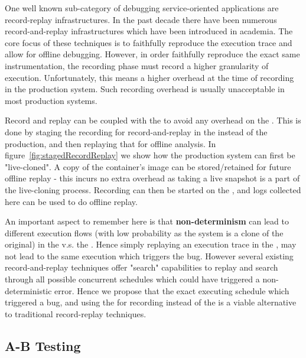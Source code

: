 One well known sub-category of debugging service-oriented applications are record-replay infrastructures.
In the past decade there have been numerous record-and-replay infrastructures which have been introduced in academia.
The core focus of these techniques is to faithfully reproduce the execution trace and allow for offline debugging.
However, in order faithfully reproduce the exact same instrumentation, the recording phase must record a higher granularity of execution.
Unfortunately, this means a higher overhead at the time of recording in the production system.
Such recording overhead is usually unacceptable in most production systems.

Record and replay can be coupled with the \debugcontainer to avoid any overhead on the \productioncontainer.
This is done by staging the recording for record-and-replay in the \debugcontainer instead of the production, and then replaying that for offline analysis.
In figure~\ref{fig:stagedRecordReplay} we show how the production system can first be "live-cloned". A copy of the container's image can be stored/retained for future offline replay - this incurs no extra overhead as taking a live snapshot is a part of the live-cloning process. Recording can then be started on the \debugcontainer, and logs collected here can be used to do offline replay.

An important aspect to remember here is that \textbf{non-determinism} can lead to different execution flows (with low probability as the system is a clone of the original) in the \debugcontainer v.s. the \productioncontainer.
Hence simply replaying an execution trace in the \debugcontainer, may not lead to the same execution which triggers the bug.
However several existing record-and-replay techniques offer "search" capabilities to replay and search through all possible concurrent schedules which could have triggered a non-deterministic error.
Hence we propose that the exact executing schedule which triggered a bug, and using the \debugcontainer for recording instead of the \productioncontainer is a viable alternative to traditional record-replay techniques.

\subsection{A-B Testing}

